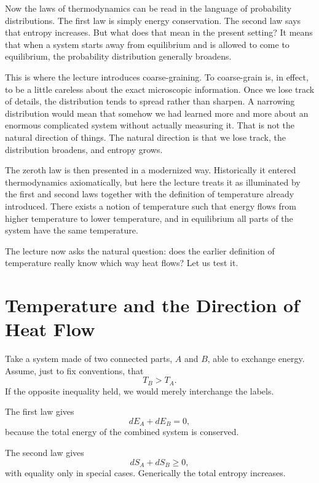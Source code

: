 Now the laws of thermodynamics can be read in the language of probability distributions. The first law is simply energy conservation. The second law says that entropy increases. But what does that mean in the present setting? It means that when a system starts away from equilibrium and is allowed to come to equilibrium, the probability distribution generally broadens.

This is where the lecture introduces coarse-graining. To coarse-grain is, in effect, to be a little careless about the exact microscopic information. Once we lose track of details, the distribution tends to spread rather than sharpen. A narrowing distribution would mean that somehow we had learned more and more about an enormous complicated system without actually measuring it. That is not the natural direction of things. The natural direction is that we lose track, the distribution broadens, and entropy grows.

The zeroth law is then presented in a modernized way. Historically it entered thermodynamics axiomatically, but here the lecture treats it as illuminated by the first and second laws together with the definition of temperature already introduced. There exists a notion of temperature such that energy flows from higher temperature to lower temperature, and in equilibrium all parts of the system have the same temperature.

The lecture now asks the natural question: does the earlier definition of temperature really know which way heat flows? Let us test it.

\section{Temperature and the Direction of Heat Flow}

Take a system made of two connected parts, \(A\) and \(B\), able to exchange energy. Assume, just to fix conventions, that
\begin{equation}
T_B>T_A.
\end{equation}
If the opposite inequality held, we would merely interchange the labels.

The first law gives
\begin{equation}
dE_A+dE_B=0,
\end{equation}
because the total energy of the combined system is conserved.

The second law gives
\begin{equation}
dS_A+dS_B\ge 0,
\end{equation}
with equality only in special cases. Generically the total entropy increases.

